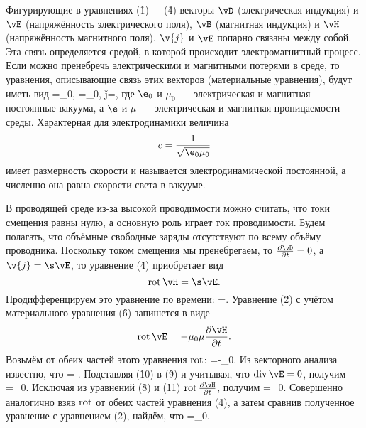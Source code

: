 Фигурирующие в уравнениях (\r1)~--~(\r4) векторы $\vD$ (электрическая индукция) и $\vE$ (напряжённость электрического
поля), $\vB$ (магнитная индукция) и $\vH$ (напряжённость магнитного поля), $\v{j}$ и $\vE$ попарно связаны между собой.
Эта связь определяется средой, в которой происходит электромагнитный процесс. Если можно пренебречь электрическими и
магнитными потерями в среде, то уравнения, описывающие связь этих векторов (материальные уравнения), будут иметь вид
\vD=\e_0\e\vE,
\ee
{}
\vB=\mu_0\mu\vH,
\ee
{}
\v{j}=\s\vE,
\ee
где $\e_0$ и $\mu_0$~--- электрическая и магнитная постоянные вакуума, а $\e$ и $\mu$~--- электрическая и магнитная
проницаемости среды. Характерная для электродинамики величина
\[
c=\frac{1}{\sqrt{\e_0\mu_0}}
\]
имеет размерность скорости и называется электродинамической постоянной, а численно она равна скорости света в вакууме.

 В проводящей среде из-за высокой проводимости можно считать, что токи
смещения равны нулю, а основную роль играет ток проводимости. Будем полагать, что объёмные свободные заряды отсутствуют
по всему объёму проводника. Поскольку током смещения мы пренебрегаем, то $\ddt{\vD}=0$, а $\v{j}=\s\vE$, то уравнение
(\r4) приобретает вид
\[
\rot\vH=\s\vE.
\]
Продифференцируем это уравнение по времени:
\rot\ddt{\vH}=\s\ddt{\vE}.
\ee
Уравнение (\r2) с учётом материального уравнения (\r6) запишется в виде
\[
\rot\vE=-\mu_0\mu\ddt{\vH}.
\]
Возьмём от обеих частей этого уравнения $\mathop{\mathrm{rot}}$:
\rot\rot\vE=-\mu_0\mu\rot\ddt{\vH}.
\ee
Из векторного анализа известно, что
\rot\rot\vE=\grad\divv\vE-\D\vE.
\ee
Подставляя (\r{10}) в (\r9) и учитывая, что $\divv\vE=0$, получим
\D\vE=\mu_0\mu\rot\ddt{\vH}.
\ee
Исключая из уравнений (\r8) и (\r{11}) $\rot\ddt{\vH}$, получим
\D\vE=\mu_0\mu\s\ddt{\vE}.
\ee
Совершенно аналогично взяв $\mathop{\mathrm{rot}}$ от обеих частей уравнения (\r4), а затем сравнив полученное уравнение с уравнением
(\r2), найдём, что
\D\vH=\mu_0\mu\s\ddt{\vH}.
\ee


